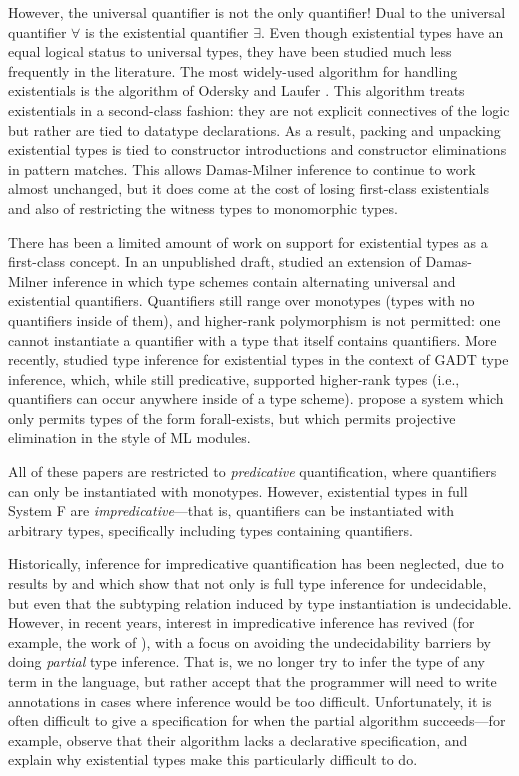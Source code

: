 However, the universal quantifier is not the only quantifier! Dual to the
universal quantifier $\forall$ is the existential quantifier $\exists$. Even
though existential types have an equal logical status to universal types, they
have been studied much less frequently in the literature. The most widely-used
algorithm for handling existentials is the algorithm of Odersky and Laufer
\cite{laufer94:polymorphic}. This algorithm treats existentials in a
second-class fashion: they are not explicit connectives of the logic but rather
are tied to datatype declarations. As a result, packing and unpacking
existential types is tied to constructor introductions and constructor
eliminations in pattern matches. This allows Damas-Milner inference to continue
to work almost unchanged, but it does come at the cost of losing first-class
existentials and also of restricting the witness types to monomorphic types.

There has been a limited amount of work on support for existential types as a
first-class concept. In an unpublished draft, \citet{leijen06:first-class}
studied an extension of Damas-Milner inference in which type schemes contain
alternating universal and existential quantifiers. Quantifiers still range over
monotypes (\ie types with no quantifiers inside of them), and higher-rank 
polymorphism is not permitted: one cannot instantiate a quantifier with a type
that itself contains quantifiers.
More recently,
\citet{dunfield16:existential} studied type inference for existential types in
the context of GADT type inference, which, while still predicative, supported
higher-rank types (i.e., quantifiers can occur anywhere inside of a type
scheme). \citet{eisenberg21:existential} propose a system which only permits
types of the form forall-exists, but which permits projective elimination in the
style of ML modules. 

All of these papers are restricted to \emph{predicative} quantification, where
quantifiers can only be instantiated with monotypes. However, existential types
in full System F are \emph{impredicative}---that is, quantifiers can be
instantiated with arbitrary types, specifically including types containing
quantifiers.

Historically, inference for impredicative quantification has been neglected, due
to results by \citet{tiuryn-urzczyn-96} and \citet{chrzaszcz-98} which show that
not only is full type inference for \systemf undecidable, but even that the
subtyping relation induced by type instantiation is undecidable. However, in
recent years, interest in impredicative inference has revived (for example, the
work of \citet{serrano-2020}), with a focus on avoiding the undecidability
barriers by doing \emph{partial} type inference. That is, we no longer try to
infer the type of any term in the language, but rather accept that the
programmer will need to write annotations in cases where inference would be too
difficult. Unfortunately, it is often difficult to give a specification for when
the partial algorithm succeeds---for example, \citet{eisenberg21:existential}
observe that their algorithm lacks a declarative specification, and explain why
existential types make this particularly difficult to do. 

